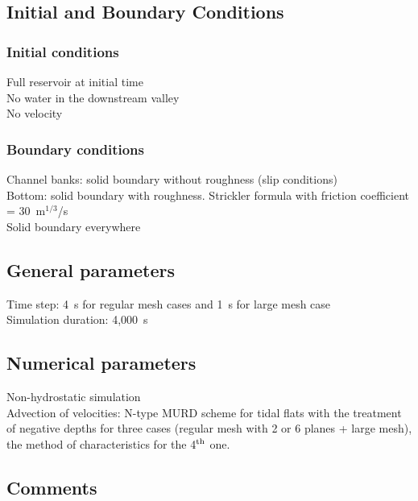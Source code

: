 \subsection{Initial and Boundary Conditions}
%
\subsubsection{Initial conditions}
%
Full reservoir at initial time\\
No water in the downstream valley\\
No velocity
%
\subsubsection{Boundary conditions}
%
Channel banks: solid boundary without roughness (slip conditions)\\
Bottom: solid boundary with roughness.
Strickler formula with friction coefficient = 30~m$^{1/3}$/s\\
Solid boundary everywhere
%
\subsection{General parameters}
%
Time step: 4~s for regular mesh cases and 1~s for large mesh case\\
Simulation duration: 4,000~s
%
%
%
\subsection{Numerical parameters}
%
Non-hydrostatic simulation\\
Advection of velocities: N-type MURD scheme for tidal flats
with the treatment of negative depths for three cases
(regular mesh with 2 or 6 planes + large mesh),
the method of characteristics for the 4$^{\rm{th}}$ one.
%
\subsection{Comments}
%
%
%
